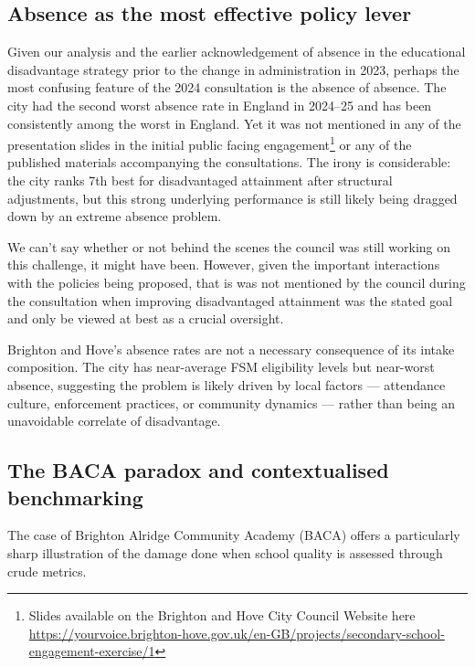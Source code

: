 \documentclass[
  12pt,
  titlepage]{article}
\begin{document}
\subsection{Absence as the most effective policy
lever}\label{absence-as-the-most-effective-policy-lever}

Given our analysis and the earlier acknowledgement of absence in the
educational disadvantage strategy prior to the change in administration
in 2023, perhaps the most confusing feature of the 2024 consultation is
the absence of absence. The city had the second worst absence rate in
England in 2024--25 and has been consistently among the worst in
England. Yet it was not mentioned in any of the presentation slides in
the initial public facing engagement\footnote{Slides available on the
  Brighton and Hove City Council Website here
  \url{https://yourvoice.brighton-hove.gov.uk/en-GB/projects/secondary-school-engagement-exercise/1}}
or any of the published materials accompanying the consultations. The
irony is considerable: the city ranks 7th best for disadvantaged
attainment after structural adjustments, but this strong underlying
performance is still likely being dragged down by an extreme absence
problem.

We can't say whether or not behind the scenes the council was still
working on this challenge, it might have been. However, given the
important interactions with the policies being proposed, that is was not
mentioned by the council during the consultation when improving
disadvantaged attainment was the stated goal and only be viewed at best
as a crucial oversight.

Brighton and Hove's absence rates are not a necessary consequence of its
intake composition. The city has near-average FSM eligibility levels but
near-worst absence, suggesting the problem is likely driven by local
factors --- attendance culture, enforcement practices, or community
dynamics --- rather than being an unavoidable correlate of disadvantage.

\subsection{The BACA paradox and contextualised
benchmarking}\label{the-baca-paradox-and-contextualised-benchmarking}

The case of Brighton Alridge Community Academy (BACA) offers a
particularly sharp illustration of the damage done when school quality
is assessed through crude metrics.
\end{document}
